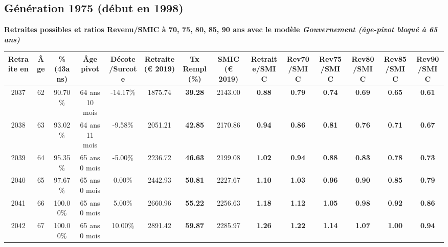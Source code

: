 \subsection{Génération 1975 (début en 1998)} 

{\bf \noindent Retraites possibles et ratios Revenu/SMIC à 70, 75, 80, 85, 90 ans avec le modèle \emph{Gouvernement (âge-pivot bloqué à 65 ans)}}  
 
\begin{adjustbox}{max width=\textwidth} 
\begin{tabular}[htb]{|c|c||c|c|c||c|c||c||c|c|c|c|c|c|} 
\hline 
 Retraite en &  Âge &  \%(43ans) &  Âge pivot &  Décote/Surcote &  Retraite (\euro{} 2019) &  Tx Rempl(\%) &  SMIC (\euro{} 2019) &  Retraite/SMIC &  Rev70/SMIC &  Rev75/SMIC &  Rev80/SMIC &  Rev85/SMIC &  Rev90/SMIC \\ 
\hline \hline 
 2037 &  62 &  90.70\% &  64 ans 10 mois &  -14.17\% &  1875.74 &  {\bf 39.28} &  2143.00 &  {\bf {\color{red} 0.88}} &  {\bf {\color{red} 0.79}} &  {\bf {\color{red} 0.74}} &  {\bf {\color{red} 0.69}} &  {\bf {\color{red} 0.65}} &  {\bf {\color{red} 0.61}} \\ 
\hline 
 2038 &  63 &  93.02\% &  64 ans 11 mois &  -9.58\% &  2051.21 &  {\bf 42.85} &  2170.86 &  {\bf {\color{red} 0.94}} &  {\bf {\color{red} 0.86}} &  {\bf {\color{red} 0.81}} &  {\bf {\color{red} 0.76}} &  {\bf {\color{red} 0.71}} &  {\bf {\color{red} 0.67}} \\ 
\hline 
 2039 &  64 &  95.35\% &  65 ans 0 mois &  -5.00\% &  2236.72 &  {\bf 46.63} &  2199.08 &  {\bf 1.02} &  {\bf {\color{red} 0.94}} &  {\bf {\color{red} 0.88}} &  {\bf {\color{red} 0.83}} &  {\bf {\color{red} 0.78}} &  {\bf {\color{red} 0.73}} \\ 
\hline 
 2040 &  65 &  97.67\% &  65 ans 0 mois &  0.00\% &  2442.93 &  {\bf 50.81} &  2227.67 &  {\bf 1.10} &  {\bf 1.03} &  {\bf {\color{red} 0.96}} &  {\bf {\color{red} 0.90}} &  {\bf {\color{red} 0.85}} &  {\bf {\color{red} 0.79}} \\ 
\hline 
 2041 &  66 &  100.00\% &  65 ans 0 mois &  5.00\% &  2660.96 &  {\bf 55.22} &  2256.63 &  {\bf 1.18} &  {\bf 1.12} &  {\bf 1.05} &  {\bf {\color{red} 0.98}} &  {\bf {\color{red} 0.92}} &  {\bf {\color{red} 0.86}} \\ 
\hline 
 2042 &  67 &  100.00\% &  65 ans 0 mois &  10.00\% &  2891.42 &  {\bf 59.87} &  2285.97 &  {\bf 1.26} &  {\bf 1.22} &  {\bf 1.14} &  {\bf 1.07} &  {\bf 1.00} &  {\bf {\color{red} 0.94}} \\ 
\hline 
\hline 
\end{tabular} 
\end{adjustbox} 
 
